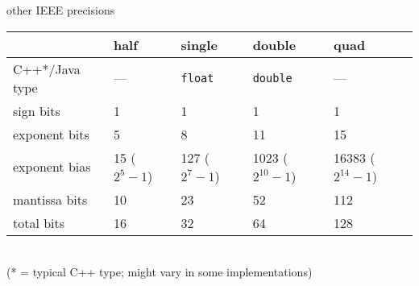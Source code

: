 \begin{frame}{other IEEE precisions}
\begin{tabular}{l|llll}
~ & half & single & double & quad \\ \hline
C++*/Java type& --- & \texttt{float} & \texttt{double} & ---\\
sign bits & 1 & 1 & 1 & 1\\
exponent bits & 5 & 8 & 11 & 15 \\
    exponent bias & 15 {\small ($2^5-1$)} & 127 {\small ($2^7-1$)} & 1023 {\small ($2^{10}-1$)} & 16383 {\small ($2^{14}-1$)}\\
mantissa bits & 10 & 23 & 52 & 112\\
total bits & 16 & 32 & 64 & 128\\
\end{tabular}\\
    {\scriptsize (* = typical C++ type; might vary in some implementations)}
\end{frame}
